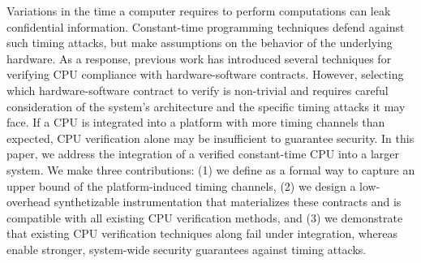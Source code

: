 Variations in the time a computer requires to perform computations can leak confidential information.
Constant-time programming techniques defend against such timing attacks, but make assumptions on the behavior of the underlying hardware.
As a response, previous work has introduced several techniques for verifying CPU compliance with hardware-software contracts.
%
However, selecting which hardware-software contract to verify is non-trivial and requires careful consideration of the system's architecture and the specific timing attacks it may face.
If a CPU is integrated into a platform with more timing channels than expected, CPU verification alone may be insufficient to guarantee security.
In this paper, we address the integration of a verified constant-time CPU into a larger system.
We make three contributions: (1) we define \pics as a formal way to capture an upper bound of the platform-induced timing channels, (2) we design a low-overhead synthetizable instrumentation that materializes these contracts and is compatible with all existing CPU verification methods, and (3) we demonstrate that existing CPU verification techniques along fail under integration, whereas \pics enable stronger, system-wide security guarantees against timing attacks.

